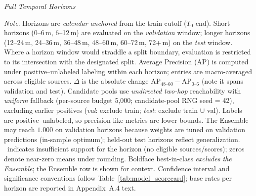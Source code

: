 \begin{landscape}
\pagestyle{landscape}
\begin{table}[H]
  \centering
  \caption[\textit{Full Temporal Horizons}]
  {\textit{Full Temporal Horizons}}
  \label{tab:full_temporal_horizons}


\resizebox{\linewidth}{!}
{}

  \captionsetup{justification=raggedright,singlelinecheck=false}
  \caption*{\footnotesize \textit{Note}. Horizons are \emph{calendar-anchored} from the train cutoff ($T_0$ end).
  Short horizons (0--6\,m, 6--12\,m) are evaluated on the \textit{validation} window; longer horizons (12--24\,m, 24--36\,m, 36--48\,m, 48--60\,m, 60--72\,m, 72+\,m) on the \textit{test} window. 
  Where a horizon window would straddle a split boundary, evaluation is restricted to its intersection with the designated split.
  Average Precision (AP) is computed under positive--unlabeled labeling within each horizon; entries are macro-averaged across eligible sources. 
  $\Delta$ is the absolute change $\mathrm{AP}_{48\text{--}60} - \mathrm{AP}_{0\text{--}6}$ (note it spans validation and test).
  Candidate pools use \emph{undirected two-hop} reachability with \emph{uniform} fallback (per-source budget 5{,}000; candidate-pool RNG seed = 42), excluding earlier positives (\textit{val}: exclude train; \textit{test}: exclude train $\cup$ val).
  Labels are positive--unlabeled, so precision-like metrics are lower bounds.
  The Ensemble may reach $1.000$ on validation horizons because weights are tuned on validation predictions (in-sample optimum); held-out test horizons reflect generalization.
  \NA\ indicates insufficient support for the horizon (no eligible sources/scores); zeros denote near-zero means under rounding.
  Boldface best-in-class \emph{excludes the Ensemble}; the Ensemble row is shown for context.
  Confidence interval and significance conventions follow Table~\ref{tab:model_scorecard}; base rates per horizon are reported in Appendix~A.4 text.}
\end{table}
\end{landscape}
\pagestyle{fancy}

